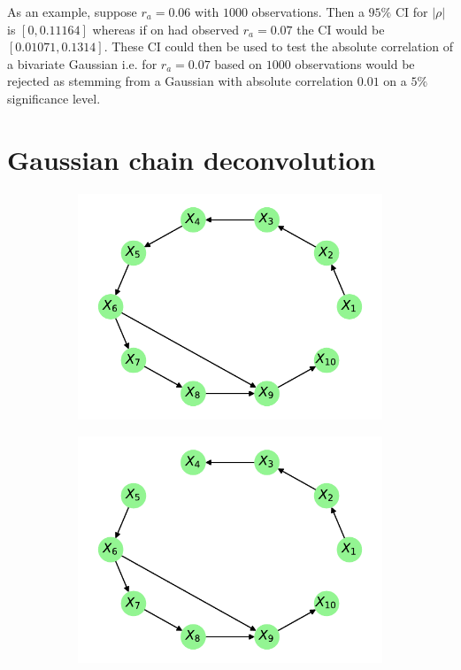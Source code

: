 \documentclass[../Thesis.tex]{subfiles}
\begin{document}
As an example, suppose $r_a=0.06$ with $1000$ observations. Then a $95\%$ CI for $|\rho|$ is $[0, 0.11164]$ whereas if on had observed $r_a = 0.07$ the CI would be $[0.01071, 0.1314]$. These CI could then be used to test the absolute correlation of a bivariate Gaussian i.e. for $r_a = 0.07$ based on $1000$ observations would be rejected as stemming from a Gaussian with absolute correlation $0.01$ on a $5\%$ significance level.


\newpage
\section{Gaussian chain deconvolution}

\begin{figure}[H]
    \centering
    \begin{subfigure}[t]{0.49\textwidth}
        \centering
        \includegraphics[width=.95\linewidth]{figures/Gaussian Chain Theoretical/Chain graph from triangular G obs - MI - cutoff 2e-2.pdf}
        \caption{}
    \end{subfigure}
    \hfill
    \begin{subfigure}[t]{0.49\textwidth}
        \centering
        \includegraphics[width=.95\linewidth]{figures/Gaussian Chain Theoretical/Chain graph from triangular G obs - MI - cutoff 2_1e-2.pdf}

\end{subfigure}
\end{figure}
\end{document}
